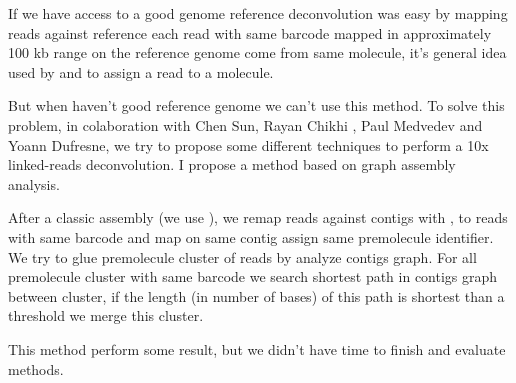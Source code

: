 \documentclass[main.tex]{subfiles}
\begin{document}
If we have access to a good genome reference deconvolution was easy by mapping reads against reference each read with same barcode mapped in approximately 100 kb range on the reference genome come from same molecule, it's general idea used by \cite{ema} and \cite{lariat} to assign a read to a molecule.

But when haven't good reference genome we can't use this method. To solve this problem, in colaboration with Chen Sun, Rayan Chikhi , Paul Medvedev and Yoann Dufresne, we try to propose some different techniques to perform a 10x linked-reads deconvolution. I propose a method based on graph assembly analysis.

After a classic \DBG assembly (we use ), we remap reads against contigs with , to reads with same barcode and map on same contig  assign same premolecule identifier. We try to glue premolecule cluster of reads by analyze contigs graph. For all premolecule cluster with same barcode we search shortest path in contigs graph between cluster, if the length (in number of bases) of this path is shortest than a threshold we merge this cluster. 

This method perform some result, but we didn't have time to finish and evaluate methods.

\end{document}
